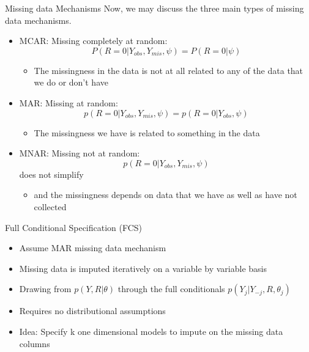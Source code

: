\begin{frame}{Missing data Mechanisms}
Now, we may discuss the three main types of missing data mechanisms. 
\begin{itemize}

\item MCAR: Missing completely at random:  $$P(R=0|Y_{obs},Y_{mis},\psi)=P(R=0|\psi)$$
\begin{itemize}
\item The missingness in the data is not at all related to any of the data that we do or don't have
\end{itemize}
\item MAR: Missing at random: $$p(R=0|Y_{obs},Y_{mis},\psi)= p(R=0|Y_{obs},\psi)$$
\begin{itemize}
 \item The missingness we have is related to something in the data 
\end{itemize}
\item MNAR: Missing not at random: $$p(R=0|Y_{obs},Y_{mis},\psi)$$ does not simplify
\begin{itemize}
 \item  and the missingness depends on data that we have as well as have not collected
\end{itemize}
\end{itemize}
 
\end{frame}


\begin{frame}{Full Conditional Specification (FCS)}
 \begin{itemize}
  \item Assume MAR missing data mechanism %
  \item Missing data is imputed iteratively on a variable by variable basis
  \item Drawing from $p(Y,R|\theta)$ through the full conditionals $p(Y_j|Y_{-j},R,\theta_j)$
  \item Requires no distributional assumptions
  \item Idea: Specify k one dimensional models to impute on the missing data columns
 \end{itemize}

\end{frame}


